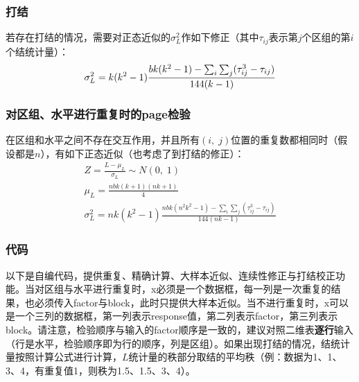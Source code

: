 \subsubsection{打结}
若存在打结的情况，需要对正态近似的$\sigma_L^2$作如下修正（其中$\tau_{ij}$表示第$j$个区组的第$i$个结统计量）：
\begin{equation}
	\sigma_L^2=k(k^2-1)\frac{bk(k^2-1)-\sum_i\sum_j(\tau_{ij}^3-\tau_{ij})}{144(k-1)}\notag
\end{equation}
\subsubsection{对区组、水平进行重复时的page检验}
在区组和水平之间不存在交互作用，并且所有$(i,\;j)$位置的重复数都相同时（假设都是$n$），有如下正态近似（也考虑了到打结的修正）：
\begin{gather*}
	Z=\frac{L-\mu_L}{\sigma_L}\sim N(0,\;1) \\
	\mu_L=\frac{nbk(k+1)(nk+1)}{4} \\
	\sigma_L^2=nk(k^2-1)\frac{nbk(n^2k^2-1)-\sum_i\sum_j(\tau_{ij}^3-\tau_{ij})}{144(nk-1)}
\end{gather*}
\subsubsection{代码}
以下是自编代码，提供重复、精确计算、大样本近似、连续性修正与打结校正功能。当对区组与水平进行重复时，x必须是一个数据框，每一列是一次重复的结果，也必须传入factor与block，此时只提供大样本近似。当不进行重复时，x可以是一个三列的数据框，第一列表示response值，第二列表示factor，第三列表示block。请注意，检验顺序与输入的factor顺序是一致的，建议对照二维表\textbf{逐行}输入（行是水平，检验顺序即为行的顺序，列是区组）。如果出现打结的情况，结统计量按照计算公式进行计算，$L$统计量的秩部分取结的平均秩（例：数据为1、1、3、4，有重复值1，则秩为1.5、1.5、3、4）。
\inputminted[bgcolor=white, linenos, frame=single, numbersep=5pt, breaklines]{r}{nonparametric-statistics/chapter3/page.R}